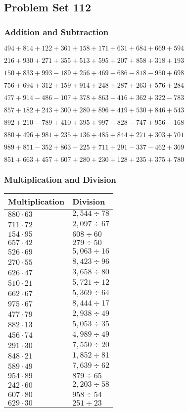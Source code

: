 \hypertarget{problem-set-112}{%
\subsection{Problem Set 112}\label{problem-set-112}}

\hypertarget{addition-and-subtraction}{%
\subsubsection{Addition and
Subtraction}\label{addition-and-subtraction}}

\(494 +814 +122 +361 +158 +171 +631 +684 +669 +594\)

\(216 +930 +271 +355 +513 +595 +207 +858 +318 +193\)

\(150 +833 +993 - 189 +256 +469 - 686 - 818 - 950 +698\)

\(756 +694 +312 +159 +914 +248 +287 +263 +576 +284\)

\(477 +914 - 486 - 107 +378 +863 - 416 +362 +322 - 783\)

\(857 +182 +243 +300 +280 +896 +419 +530 +846 +543\)

\(892 +210 - 789 +410 +395 +997 - 828 - 747 +956 - 168\)

\(880 +496 +981 +235 +136 +485 +844 +271 +303 +701\)

\(989 +851 - 352 +863 - 225 +711 +291 - 337 - 462 +369\)

\(851 +663 +457 +607 +280 +230 +128 +235 +375 +780\)

\hypertarget{multiplication-and-division}{%
\subsubsection{Multiplication and
Division}\label{multiplication-and-division}}

\begin{longtable}[]{@{}ll@{}}
\toprule
Multiplication & Division\tabularnewline
\midrule
\endhead
\(880 \cdot 63\) & \(2,544÷78\)\tabularnewline
\(711 \cdot 72\) & \(2,097÷67\)\tabularnewline
\(154 \cdot 95\) & \(608÷60\)\tabularnewline
\(657 \cdot 42\) & \(279÷50\)\tabularnewline
\(526 \cdot 69\) & \(5,063÷16\)\tabularnewline
\(270 \cdot 55\) & \(8,423÷96\)\tabularnewline
\(626 \cdot 47\) & \(3,658÷80\)\tabularnewline
\(510 \cdot 21\) & \(5,721÷12\)\tabularnewline
\(662 \cdot 67\) & \(5,369÷64\)\tabularnewline
\(975 \cdot 67\) & \(8,444÷17\)\tabularnewline
\(477 \cdot 79\) & \(2,938÷49\)\tabularnewline
\(882 \cdot 13\) & \(5,053÷35\)\tabularnewline
\(456 \cdot 74\) & \(4,989÷49\)\tabularnewline
\(291 \cdot 30\) & \(7,550÷20\)\tabularnewline
\(848 \cdot 21\) & \(1,852÷81\)\tabularnewline
\(589 \cdot 49\) & \(7,639÷62\)\tabularnewline
\(954 \cdot 89\) & \(879÷65\)\tabularnewline
\(242 \cdot 60\) & \(2,203÷58\)\tabularnewline
\(607 \cdot 80\) & \(958÷54\)\tabularnewline
\(629 \cdot 30\) & \(251÷23\)\tabularnewline
\bottomrule
\end{longtable}
